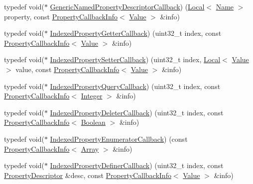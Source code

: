 \begin{DoxyCompactItemize}
\item 
typedef void($\ast$ \mbox{\hyperlink{namespacev8_a8cf8faa26baffa84173a24906c0d49f6}{Generic\+Named\+Property\+Descriptor\+Callback}}) (\mbox{\hyperlink{classv8_1_1Local}{Local}}$<$ \mbox{\hyperlink{classv8_1_1Name}{Name}} $>$ property, const \mbox{\hyperlink{classv8_1_1PropertyCallbackInfo}{Property\+Callback\+Info}}$<$ \mbox{\hyperlink{classv8_1_1Value}{Value}} $>$ \&info)
\item 
typedef void($\ast$ \mbox{\hyperlink{namespacev8_a48e7816ba64447bf32a25d194588daaf}{Indexed\+Property\+Getter\+Callback}}) (uint32\+\_\+t index, const \mbox{\hyperlink{classv8_1_1PropertyCallbackInfo}{Property\+Callback\+Info}}$<$ \mbox{\hyperlink{classv8_1_1Value}{Value}} $>$ \&info)
\item 
typedef void($\ast$ \mbox{\hyperlink{namespacev8_a4ac7cc6185ebc8b6a199f9fa8e6bf5c3}{Indexed\+Property\+Setter\+Callback}}) (uint32\+\_\+t index, \mbox{\hyperlink{classv8_1_1Local}{Local}}$<$ \mbox{\hyperlink{classv8_1_1Value}{Value}} $>$ value, const \mbox{\hyperlink{classv8_1_1PropertyCallbackInfo}{Property\+Callback\+Info}}$<$ \mbox{\hyperlink{classv8_1_1Value}{Value}} $>$ \&info)
\item 
typedef void($\ast$ \mbox{\hyperlink{namespacev8_a980b62c33eb664783e61e25c3b27f9ee}{Indexed\+Property\+Query\+Callback}}) (uint32\+\_\+t index, const \mbox{\hyperlink{classv8_1_1PropertyCallbackInfo}{Property\+Callback\+Info}}$<$ \mbox{\hyperlink{classv8_1_1Integer}{Integer}} $>$ \&info)
\item 
typedef void($\ast$ \mbox{\hyperlink{namespacev8_a53863728de14cde48dd6543207b2f2da}{Indexed\+Property\+Deleter\+Callback}}) (uint32\+\_\+t index, const \mbox{\hyperlink{classv8_1_1PropertyCallbackInfo}{Property\+Callback\+Info}}$<$ \mbox{\hyperlink{classv8_1_1Boolean}{Boolean}} $>$ \&info)
\item 
typedef void($\ast$ \mbox{\hyperlink{namespacev8_adbb0a6d5537371953f9ba807d4f6275e}{Indexed\+Property\+Enumerator\+Callback}}) (const \mbox{\hyperlink{classv8_1_1PropertyCallbackInfo}{Property\+Callback\+Info}}$<$ \mbox{\hyperlink{classv8_1_1Array}{Array}} $>$ \&info)
\item 
typedef void($\ast$ \mbox{\hyperlink{namespacev8_a967435db933fa9798caac467948499df}{Indexed\+Property\+Definer\+Callback}}) (uint32\+\_\+t index, const \mbox{\hyperlink{classv8_1_1PropertyDescriptor}{Property\+Descriptor}} \&desc, const \mbox{\hyperlink{classv8_1_1PropertyCallbackInfo}{Property\+Callback\+Info}}$<$ \mbox{\hyperlink{classv8_1_1Value}{Value}} $>$ \&info)
\item 

\end{DoxyCompactItemize}
